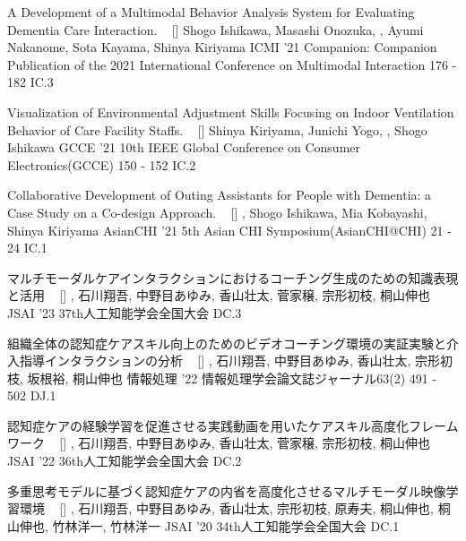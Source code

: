 
\begin{publications}
	\publication
    {A Development of a Multimodal Behavior Analysis System for Evaluating Dementia Care Interaction.}
	{
		~ [\href{https://doi.org/10.1145/3461615.3485402}{\small{\linkSymbol}}]
	}
    {Shogo Ishikawa, Masashi Onozuka, \underline{}, Ayumi Nakanome, Sota Kayama, Shinya Kiriyama}
	{ICMI '21} {Companion: Companion Publication of the 2021 International Conference on Multimodal Interaction 176 - 182} {IC.3}

	\publication
    {Visualization of Environmental Adjustment Skills Focusing on Indoor Ventilation Behavior of Care Facility Staffs.}
	{
		~ [\href{https://doi.org/10.1109/GCCE53005.2021.9622089}{\small{\linkSymbol}}]
	}
    {Shinya Kiriyama, Junichi Yogo, \underline{}, Shogo Ishikawa}	
	{GCCE '21} {10th IEEE Global Conference on Consumer Electronics(GCCE) 150 - 152} {IC.2}

	\publication
    {Collaborative Development of Outing Assistants for People with Dementia: a Case Study on a Co-design Approach. }
	{
		~ [\href{https://doi.org/10.1145/3429360.3468173}{\small{\linkSymbol}}]
	}
    {\underline{}, Shogo Ishikawa, Mia Kobayashi, Shinya Kiriyama}
	{AsianCHI '21} {5th Asian CHI Symposium(AsianCHI@CHI) 21 - 24} {IC.1}

\end{publications}

\begin{publications}
	\publication
	{マルチモーダルケアインタラクションにおけるコーチング生成のための知識表現と活用}
	{
		~ [\href{https://doi.org/10.11517/pjsai.jsai2023.0_3xin421}{\small{\linkSymbol}}]
	}
	{\underline{}, 石川翔吾, 中野目あゆみ, 香山壮太, 菅家穣, 宗形初枝, 桐山伸也}
	{JSAI '23} {37th人工知能学会全国大会} {DC.3}

	\publication
	{組織全体の認知症ケアスキル向上のためのビデオコーチング環境の実証実験と介入指導インタラクションの分析}
	{
	~ [\href{https://doi.org/10.20729/00216257}{\small{\linkSymbol}}]
	}
	{\underline{}, 石川翔吾, 中野目あゆみ, 香山壮太, 宗形初枝, 坂根裕, 桐山伸也}
	{情報処理 '22} {情報処理学会論文誌ジャーナル63(2) 491 - 502} {DJ.1}
	
	\publication
	{認知症ケアの経験学習を促進させる実践動画を用いたケアスキル高度化フレームワーク}
	{
		~ [\href{https://doi.org/10.11517/pjsai.jsai2022.0_4m1gs1004}{\small{\linkSymbol}}]
	}
	{\underline{}, 石川翔吾, 中野目あゆみ, 香山壮太, 菅家穣, 宗形初枝, 桐山伸也}
	{JSAI '22} {36th人工知能学会全国大会} {DC.2}

	\publication
	{多重思考モデルに基づく認知症ケアの内省を高度化させるマルチモーダル映像学習環境 }
	{
	~ [\href{https://doi.org/10.11517/pjsai.jsai2020.0_4rin146}{\small{\linkSymbol}}]
	}
	{\underline{}, 石川翔吾, 中野目あゆみ, 香山壮太, 宗形初枝, 原寿夫, 桐山伸也, 桐山伸也, 竹林洋一, 竹林洋一}
	{JSAI '20} {34th人工知能学会全国大会} {DC.1}
\end{publications}

\vspace{-3mm}